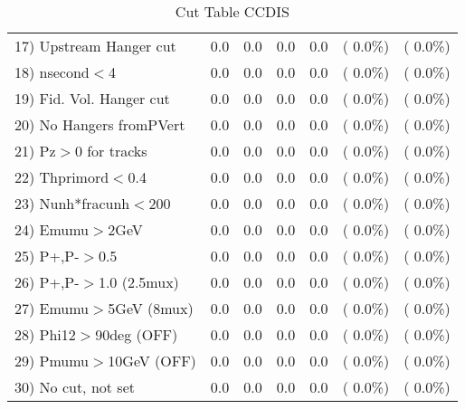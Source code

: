 \begin{table}[h!]
\begin{tabular}{||l||r|r|r|r|r|r||}
 17) Upstream Hanger cut  &          0.0 &          0.0 &          0.0 &          0.0 & (  0.0\%) & (  0.0\%) \\
 18) nsecond$<$4          &          0.0 &          0.0 &          0.0 &          0.0 & (  0.0\%) & (  0.0\%) \\
 19) Fid. Vol. Hanger cut &          0.0 &          0.0 &          0.0 &          0.0 & (  0.0\%) & (  0.0\%) \\
 20) No Hangers fromPVert &          0.0 &          0.0 &          0.0 &          0.0 & (  0.0\%) & (  0.0\%) \\
 21) Pz$>$0 for tracks    &          0.0 &          0.0 &          0.0 &          0.0 & (  0.0\%) & (  0.0\%) \\
 22) Thprimord$<$0.4      &          0.0 &          0.0 &          0.0 &          0.0 & (  0.0\%) & (  0.0\%) \\
 23) Nunh*fracunh$<$200   &          0.0 &          0.0 &          0.0 &          0.0 & (  0.0\%) & (  0.0\%) \\
 24) Emumu$>$2GeV         &          0.0 &          0.0 &          0.0 &          0.0 & (  0.0\%) & (  0.0\%) \\
 25) P+,P-$>$0.5          &          0.0 &          0.0 &          0.0 &          0.0 & (  0.0\%) & (  0.0\%) \\
 26) P+,P-$>$1.0 (2.5mux) &          0.0 &          0.0 &          0.0 &          0.0 & (  0.0\%) & (  0.0\%) \\
 27) Emumu$>$5GeV  (8mux) &          0.0 &          0.0 &          0.0 &          0.0 & (  0.0\%) & (  0.0\%) \\
 28) Phi12$>$90deg  (OFF) &          0.0 &          0.0 &          0.0 &          0.0 & (  0.0\%) & (  0.0\%) \\
 29) Pmumu$>$10GeV  (OFF) &          0.0 &          0.0 &          0.0 &          0.0 & (  0.0\%) & (  0.0\%) \\
 30) No cut, not set      &          0.0 &          0.0 &          0.0 &          0.0 & (  0.0\%) & (  0.0\%) \\
 \hline
 \hline
 \end{tabular}
 \caption{Cut Table  CCDIS    }
 \label{tab-cutcohjpsi-mumu_ncdis}
 \end{table}

